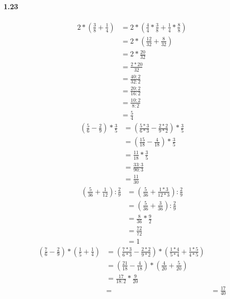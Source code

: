 \documentclass{article}
\begin{document}
\paragraph{1.23}
\begin{align*}
  2 * \left(\frac{3}{8} + \frac{1}{4}\right) &= 2 * \left(\frac{4}{4} * \frac{3}{8} + \frac{1}{4} * \frac{8}{8}\right) \\
  &= 2 * \left(\frac{12}{32} + \frac{8}{32}\right) \\
  &= 2 * \frac{20}{32} \\
  &= \frac{2 * 20}{32} \\
  &= \frac{40:2}{32:2} \\ 
  &= \frac{20:2}{16:2} \\
  &= \frac{10:2}{8:2} \\
  &= \frac{5}{4}
\end{align*}
\begin{align*}
  \left(\frac{5}{6} - \frac{2}{9}\right) * \frac{3}{5} &= \left(\frac{5*3}{6*3} - \frac{2*2}{9*2}\right) * \frac{3}{5} \\
  &= \left(\frac{15}{18} - \frac{4}{18}\right) * \frac{3}{5} \\
  &= \frac{11}{18} * \frac{3}{5} \\
  &= \frac{33:3}{90:3} \\ 
  &= \frac{11}{30}
\end{align*}
\begin{align*}
  \left(\frac{5}{36} + \frac{1}{12}\right) : \frac{2}{9} &= \left(\frac{5}{36} + \frac{1*3}{12*3}\right) : \frac{2}{9} \\
  &= \left(\frac{5}{36} + \frac{3}{36}\right) : \frac{2}{9} \\
  &= \frac{8}{36} * \frac{9}{2} \\
  &= \frac{72}{72} \\
  &= 1
\end{align*}
\begin{align*}
  \left(\frac{7}{6} - \frac{2}{9}\right) * \left(\frac{1}{5} + \frac{1}{4}\right) &= \left(\frac{7*3}{6*3} - \frac{2*2}{9*2}\right) * \left(\frac{1*4}{5*4} + \frac{1*5}{4*5}\right) \\
  &= \left(\frac{21}{18} - \frac{4}{18}\right) * \left(\frac{4}{20} + \frac{5}{20}\right) \\
  &= \frac{17}{18:2} * \frac{9}{20} \\
  &= 
  &= \frac{17}{40} \\ 

\end{align*}
\end{document}
